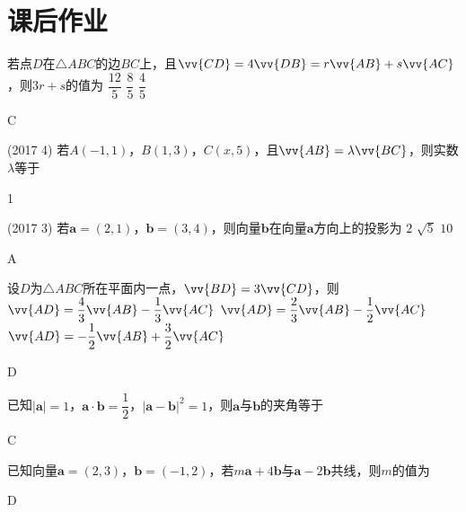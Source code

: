 \newpage
\section{课后作业}
\begin{exercise}
  \item%
    若点$D$在$\triangle{ABC}$的边$BC$上，且$\vv{CD}=4\vv{DB}=r\vv{AB}+s\vv{AC}$，则$3r+s$的值为\xz
     {$\dfrac{12}5$}
     {$\dfrac{8}5$}
     {$\dfrac{4}5$}
    \begin{answer}
      C
    \end{answer}
  \item%
    (2017  4)
    若$A(-1,1)$，$B(1,3)$，$C(x,5)$，且$\vv{AB}=\lambda\vv{BC}$，则实数$\lambda$等于\xz
    \begin{answer}
      1
    \end{answer}
  \item%
    (2017  3)
    若$\bm a=(2,1)$，$\bm b=(3,4)$，则向量$\bm b$在向量$\bm a$方向上的投影为\xz
     {$2$}
     {$\sqrt5$}
     {$10$}
    \begin{answer}
      A
    \end{answer}
  \item%
    设$D$为$\triangle{ABC}$所在平面内一点，$\vv{BD}=3\vv{CD}$，则\xz
     {$\vv{AD}=\dfrac43\vv{AB}-\dfrac13\vv{AC}$}
     {$\vv{AD}=\dfrac23\vv{AB}-\dfrac12\vv{AC}$}
     {$\vv{AD}=-\dfrac12\vv{AB}+\dfrac32\vv{AC}$}
    \begin{answer}
      D
    \end{answer}
  \item%
    已知$|\bm a|=1$，$\bm a\cdot\bm b=\dfrac12$，$|\bm a-\bm b|^2=1$，则$\bm a$与$\bm b$的夹角等于\xz
    \xx{30\degree}{45\degree}{60\degree}{120\degree}
    \begin{answer}
      C
    \end{answer}
  \item%
    已知向量$\bm a=(2,3)$，$\bm b=(-1,2)$，若$m\bm a+4\bm b$与$\bm a-2\bm b$共线，则$m$的值为\xz
    \begin{answer}
      D
    \end{answer}
  \item%

\end{exercise}
